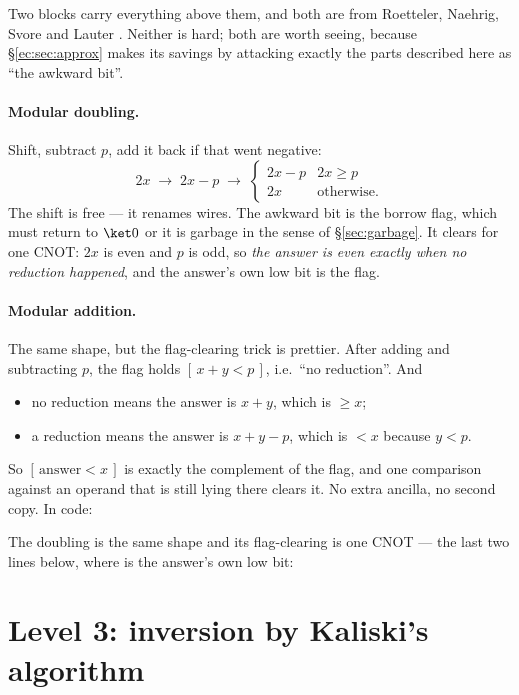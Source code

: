 Two blocks carry everything above them, and both are from Roetteler, Naehrig, Svore and Lauter
\cite{ec:rnsl17}. Neither is hard; both are worth seeing, because \S\ref{ec:sec:approx} makes its
savings by attacking exactly the parts described here as ``the awkward bit''.

\paragraph{Modular doubling.}
Shift, subtract $p$, add it back if that went negative:
\[
2x \;\longrightarrow\; 2x-p \;\longrightarrow\; \begin{cases} 2x-p & 2x\ge p\\ 2x & \text{otherwise.}\end{cases}
\]
The shift is free --- it renames wires. The awkward bit is the borrow flag, which must return to
$\ket0$ or it is garbage in the sense of \S\ref{sec:garbage}. It clears for one CNOT: $2x$ is even
and $p$ is odd, so \emph{the answer is even exactly when no reduction happened}, and the answer's
own low bit is the flag.

\paragraph{Modular addition.} The same shape, but the flag-clearing trick is prettier.
After adding and subtracting $p$, the flag holds $[\,x+y<p\,]$, i.e.\ ``no reduction''. And
\begin{itemize}\setlength\itemsep{1pt}
\item no reduction means the answer is $x+y$, which is $\ge x$;
\item a reduction means the answer is $x+y-p$, which is $<x$ because $y<p$.
\end{itemize}
So $[\,\text{answer}<x\,]$ is exactly the complement of the flag, and one comparison against an
operand that is still lying there clears it. No extra ancilla, no second copy. In code:


\noindent
The doubling is the same shape and its flag-clearing is one CNOT --- the last two lines below,
where  is the answer's own low bit:


\section{Level 3: inversion by Kaliski's algorithm}\label{ec:sec:kaliski}

